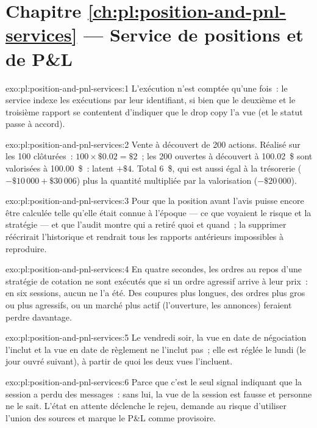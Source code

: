 \section*{Chapitre \ref{ch:pl:position-and-pnl-services} --- Service de positions et de P\&L}

\begin{solution}{exo:pl:position-and-pnl-services:1}
L'exécution n'est comptée qu'une fois~: le service indexe les exécutions par leur identifiant, si bien que le deuxième et le troisième rapport se contentent d'indiquer que le drop copy l'a vue
(et le statut passe à accord).
\end{solution}

\begin{solution}{exo:pl:position-and-pnl-services:2}
Vente à découvert de 200 actions. Réalisé sur les 100 clôturées~: $100 \times \$0.02 = \$2$~; les 200 ouvertes à découvert à 100.02~\$ sont valorisées à 100.00~\$~: latent
$+\$4$. Total 6~\$, qui est aussi égal à la trésorerie ($-\$10\,000 + \$30\,006$) plus la quantité multipliée par la valorisation ($-\$20\,000$).
\end{solution}

\begin{solution}{exo:pl:position-and-pnl-services:3}
Pour que la position avant l'avis puisse encore être calculée telle qu'elle était connue à l'époque --- ce que voyaient le risque et la stratégie --- et que l'audit montre
qui a retiré quoi et quand~; la supprimer réécrirait l'historique et rendrait tous les rapports antérieurs impossibles à reproduire.
\end{solution}

\begin{solution}{exo:pl:position-and-pnl-services:4}
En quatre secondes, les ordres au repos d'une stratégie de cotation ne sont exécutés que si un ordre agressif arrive à leur prix~: en six sessions, aucun ne l'a été.
Des coupures plus longues, des ordres plus gros ou plus agressifs, ou un marché plus actif (l'ouverture, les annonces) feraient perdre davantage.
\end{solution}

\begin{solution}{exo:pl:position-and-pnl-services:5}
Le vendredi soir, la vue en date de négociation l'inclut et la vue en date de règlement ne l'inclut pas~; elle est réglée le lundi (le jour ouvré suivant), à partir de
quoi les deux vues l'incluent.
\end{solution}

\begin{solution}{exo:pl:position-and-pnl-services:6}
Parce que c'est le seul signal indiquant que la session a perdu des messages~: sans lui, la vue de la session est fausse et personne ne le sait. L'état en attente
déclenche le rejeu, demande au risque d'utiliser l'union des sources et marque le P\&L comme provisoire.
\end{solution}

